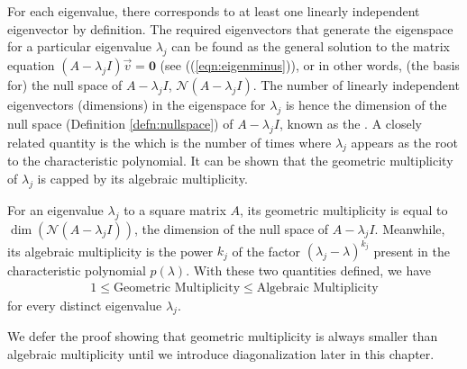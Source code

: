 For each eigenvalue, there corresponds to at least one linearly independent eigenvector by definition. The required eigenvectors that generate the eigenspace for a particular eigenvalue $\lambda_j$ can be found as the general solution to the matrix equation $(A - \lambda_j I)\vec{v} = \textbf{0}$ (see ((\ref{eqn:eigenminus})), or in other words, (the basis for) the null space of $A - \lambda_j I$, $\mathcal{N}(A-\lambda_j I)$. The number of linearly independent eigenvectors (dimensions) in the eigenspace for $\lambda_j$ is hence the dimension of the null space (Definition \ref{defn:nullspace}) of $A-\lambda_j I$, known as the . A closely related quantity is the  which is the number of times where $\lambda_j$ appears as the root to the characteristic polynomial. It can be shown that the geometric multiplicity of $\lambda_j$ is capped by its algebraic multiplicity.
\begin{thm}
\label{thm:geolessalgebra}
For an eigenvalue $\lambda_j$ to a square matrix $A$, its geometric multiplicity is equal to $\dim(\mathcal{N}(A-\lambda_j I))$, the dimension of the null space of $A-\lambda_j I$. Meanwhile, its algebraic multiplicity is the power $k_j$ of the factor $(\lambda_j - \lambda)^{k_j}$ present in the characteristic polynomial $p(\lambda)$. With these two quantities defined, we have
\begin{align*}
1 \leq \text{Geometric Multiplicity} \leq \text{Algebraic Multiplicity}
\end{align*}
for every distinct eigenvalue $\lambda_j$.
\end{thm}
We defer the proof showing that geometric multiplicity is always smaller than algebraic multiplicity until we introduce diagonalization later in this chapter.


